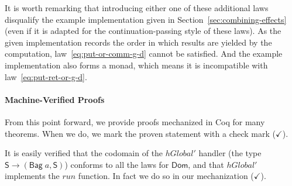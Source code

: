 \documentclass{llncs}
\newcommand{\Conid}[1]{\mathit{#1}}
\newcommand{\Varid}[1]{\mathit{#1}}
\let\Varid\mathit
\let\Conid\mathsf
\begin{document}

It is worth remarking that introducing either one of these additional laws
disqualify the example implementation given in
Section~\ref{sec:combining-effects} (even if it is adapted for the
continuation-passing style of these laws).
As the given implementation records the order in which results are yielded by
the computation, law~\eqref{eq:put-or-comm-g-d} cannot be satisfied.
And the example implementation also forms a monad, which means it is incompatible with
law~\eqref{eq:put-ret-or-g-d}.

\paragraph{Machine-Verified Proofs}
From this point forward, we provide proofs mechanized in Coq for many theorems.
When we do, we mark the proven statement with a check mark ($\checkmark$).

It is easily verified that the codomain of the \ensuremath{\Varid{hGlobal'}} handler (the
type \ensuremath{\Conid{S}\to (\Conid{Bag}\;\Varid{a},\Conid{S})}) conforms to all the laws for \ensuremath{\Conid{Dom}}, and that \ensuremath{\Varid{hGlobal'}}
implements the \ensuremath{\Varid{run}} function. In fact we do so in our mechanization
($\checkmark$).
\end{document}
